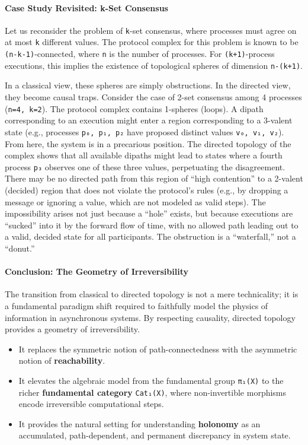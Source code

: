 \documentclass[
]{article}
\providecommand{\tightlist}{%
  \setlength{\itemsep}{0pt}\setlength{\parskip}{0pt}}
\begin{document}
\paragraph{Case Study Revisited: k-Set
Consensus}\label{case-study-revisited-k-set-consensus}

Let us reconsider the problem of \texttt{k}-set consensus, where
processes must agree on at most \texttt{k} different values. The
protocol complex for this problem is known to be
\texttt{(n-k-1)}-connected, where \texttt{n} is the number of processes.
For \texttt{(k+1)}-process executions, this implies the existence of
topological spheres of dimension \texttt{n-(k+1)}.

In a classical view, these spheres are simply obstructions. In the
directed view, they become causal traps. Consider the case of 2-set
consensus among 4 processes (\texttt{n=4,\ k=2}). The protocol complex
contains 1-spheres (loops). A dipath corresponding to an execution might
enter a region corresponding to a 3-valent state (e.g., processes
\texttt{p₀,\ p₁,\ p₂} have proposed distinct values
\texttt{v₀,\ v₁,\ v₂}). From here, the system is in a precarious
position. The directed topology of the complex shows that all available
dipaths might lead to states where a fourth process \texttt{p₃} observes
one of these three values, perpetuating the disagreement. There may be
no directed path from this region of ``high contention'' to a 2-valent
(decided) region that does not violate the protocol's rules (e.g., by
dropping a message or ignoring a value, which are not modeled as valid
steps). The impossibility arises not just because a ``hole'' exists, but
because executions are ``sucked'' into it by the forward flow of time,
with no allowed path leading out to a valid, decided state for all
participants. The obstruction is a ``waterfall,'' not a ``donut.''

\paragraph{Conclusion: The Geometry of
Irreversibility}\label{conclusion-the-geometry-of-irreversibility}

The transition from classical to directed topology is not a mere
technicality; it is a fundamental paradigm shift required to faithfully
model the physics of information in asynchronous systems. By respecting
causality, directed topology provides a geometry of irreversibility.

\begin{itemize}
\tightlist
\item
  It replaces the symmetric notion of path-connectedness with the
  asymmetric notion of \textbf{reachability}.
\item
  It elevates the algebraic model from the fundamental group
  \texttt{π₁(X)} to the richer \textbf{fundamental category}
  \texttt{Cat₁(X)}, where non-invertible morphisms encode irreversible
  computational steps.
\item
  It provides the natural setting for understanding \textbf{holonomy} as
  an accumulated, path-dependent, and permanent discrepancy in system
  state.
\end{itemize}
\end{document}
